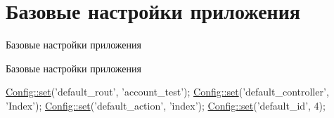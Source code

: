 \hypertarget{group__basic__config}{\section{Базовые настройки приложения}
\label{group__basic__config}
}


Базовые настройки приложения  


Базовые настройки приложения 
\begin{DoxyCode}
\hyperlink{class_config_aa485369b2925858d92e468d405bd0798}{Config::set}(\textcolor{stringliteral}{'default\_rout'}, \textcolor{stringliteral}{'account\_test'});
\hyperlink{class_config_aa485369b2925858d92e468d405bd0798}{Config::set}(\textcolor{stringliteral}{'default\_controller'}, \textcolor{stringliteral}{'Index'});
\hyperlink{class_config_aa485369b2925858d92e468d405bd0798}{Config::set}(\textcolor{stringliteral}{'default\_action'}, \textcolor{stringliteral}{'index'});
\hyperlink{class_config_aa485369b2925858d92e468d405bd0798}{Config::set}(\textcolor{stringliteral}{'default\_id'}, 4);
\end{DoxyCode}
 